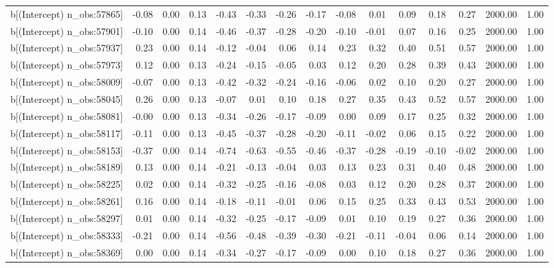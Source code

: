 \begin{table}[ht]
\begin{tabular}{rrrrrrrrrrrrrrr}
  b[(Intercept) n\_obs:57865] & -0.08 & 0.00 & 0.13 & -0.43 & -0.33 & -0.26 & -0.17 & -0.08 & 0.01 & 0.09 & 0.18 & 0.27 & 2000.00 & 1.00 \\ 
  b[(Intercept) n\_obs:57901] & -0.10 & 0.00 & 0.14 & -0.46 & -0.37 & -0.28 & -0.20 & -0.10 & -0.01 & 0.07 & 0.16 & 0.25 & 2000.00 & 1.00 \\ 
  b[(Intercept) n\_obs:57937] & 0.23 & 0.00 & 0.14 & -0.12 & -0.04 & 0.06 & 0.14 & 0.23 & 0.32 & 0.40 & 0.51 & 0.57 & 2000.00 & 1.00 \\ 
  b[(Intercept) n\_obs:57973] & 0.12 & 0.00 & 0.13 & -0.24 & -0.15 & -0.05 & 0.03 & 0.12 & 0.20 & 0.28 & 0.39 & 0.43 & 2000.00 & 1.00 \\ 
  b[(Intercept) n\_obs:58009] & -0.07 & 0.00 & 0.13 & -0.42 & -0.32 & -0.24 & -0.16 & -0.06 & 0.02 & 0.10 & 0.20 & 0.27 & 2000.00 & 1.00 \\ 
  b[(Intercept) n\_obs:58045] & 0.26 & 0.00 & 0.13 & -0.07 & 0.01 & 0.10 & 0.18 & 0.27 & 0.35 & 0.43 & 0.52 & 0.57 & 2000.00 & 1.00 \\ 
  b[(Intercept) n\_obs:58081] & -0.00 & 0.00 & 0.13 & -0.34 & -0.26 & -0.17 & -0.09 & 0.00 & 0.09 & 0.17 & 0.25 & 0.32 & 2000.00 & 1.00 \\ 
  b[(Intercept) n\_obs:58117] & -0.11 & 0.00 & 0.13 & -0.45 & -0.37 & -0.28 & -0.20 & -0.11 & -0.02 & 0.06 & 0.15 & 0.22 & 2000.00 & 1.00 \\ 
  b[(Intercept) n\_obs:58153] & -0.37 & 0.00 & 0.14 & -0.74 & -0.63 & -0.55 & -0.46 & -0.37 & -0.28 & -0.19 & -0.10 & -0.02 & 2000.00 & 1.00 \\ 
  b[(Intercept) n\_obs:58189] & 0.13 & 0.00 & 0.14 & -0.21 & -0.13 & -0.04 & 0.03 & 0.13 & 0.23 & 0.31 & 0.40 & 0.48 & 2000.00 & 1.00 \\ 
  b[(Intercept) n\_obs:58225] & 0.02 & 0.00 & 0.14 & -0.32 & -0.25 & -0.16 & -0.08 & 0.03 & 0.12 & 0.20 & 0.28 & 0.37 & 2000.00 & 1.00 \\ 
  b[(Intercept) n\_obs:58261] & 0.16 & 0.00 & 0.14 & -0.18 & -0.11 & -0.01 & 0.06 & 0.15 & 0.25 & 0.33 & 0.43 & 0.53 & 2000.00 & 1.00 \\ 
  b[(Intercept) n\_obs:58297] & 0.01 & 0.00 & 0.14 & -0.32 & -0.25 & -0.17 & -0.09 & 0.01 & 0.10 & 0.19 & 0.27 & 0.36 & 2000.00 & 1.00 \\ 
  b[(Intercept) n\_obs:58333] & -0.21 & 0.00 & 0.14 & -0.56 & -0.48 & -0.39 & -0.30 & -0.21 & -0.11 & -0.04 & 0.06 & 0.14 & 2000.00 & 1.00 \\ 
  b[(Intercept) n\_obs:58369] & 0.00 & 0.00 & 0.14 & -0.34 & -0.27 & -0.17 & -0.09 & 0.00 & 0.10 & 0.18 & 0.27 & 0.36 & 2000.00 & 1.00 \\ 

\end{tabular}
\end{table}
